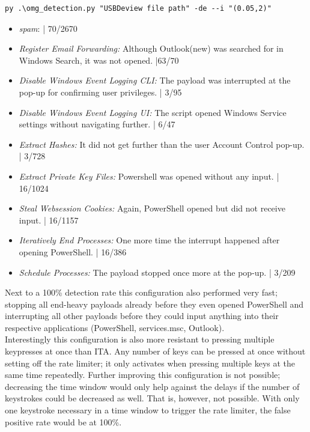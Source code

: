 \begin{lstlisting}[caption={start defence Script with TWA (0.05,2)},label={lst:start_script_twa_0.05,2}, captionpos=b]
 py .\omg_detection.py "USBDeview file path" -de --i "(0.05,2)"
\end{lstlisting}

\begin{itemize}
    \item  \emph{spam}:  | 70/2670
    \item  \emph{Register Email Forwarding:} Although Outlook(new) was searched for in Windows Search, it was not opened.  |63/70 
    \item  \emph{Disable Windows Event Logging CLI:} The payload was interrupted at the pop-up for confirming user privileges. | 3/95
    \item  \emph{Disable Windows Event Logging UI:} The script opened Windows Service settings without navigating further.  | 6/47
    \item  \emph{Extract Hashes:} It did not get further than the user Account Control pop-up. | 3/728 
    \item  \emph{Extract Private Key Files:} Powershell was opened without any input. | 16/1024
    \item  \emph{Steal Websession Cookies:} Again, PowerShell opened but did not receive input. | 16/1157
    \item  \emph{Iteratively End Processes:} One more time the interrupt happened after opening PowerShell.  | 16/386
    \item  \emph{Schedule Processes:}  The payload stopped once more at the pop-up. | 3/209
\end{itemize}

Next to a 100\% detection rate this configuration also performed very fast; stopping all end-heavy payloads already before they even opened PowerShell and interrupting all other payloads before they could input anything into their respective applications (PowerShell, services.msc, Outlook). \\
Interestingly this configuration is also more resistant to pressing multiple keypresses at once than ITA. Any number of keys can be pressed at once without setting off the rate limiter; it only activates when pressing multiple keys at the same time repeatedly. 
Further improving this configuration is not possible; decreasing the time window would only help against the delays if the number of keystrokes could be decreased as well. That is, however, not possible. With only one keystroke necessary in a time window to trigger the rate limiter, the false positive rate would be at 100\%.


